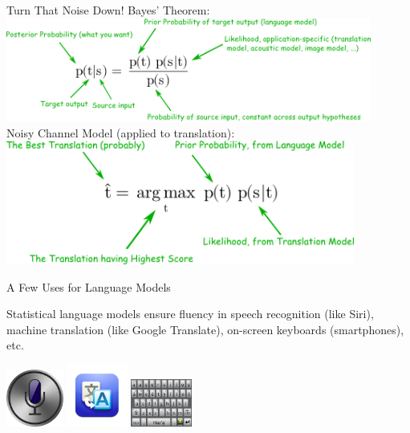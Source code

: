 \documentclass[xcolor=pdftex,x11names,table,hyperref]{beamer}
\begin{document}
\begin{frame}{Turn That Noise Down!}
	Bayes' Theorem: \\[0.5em]
	\includegraphics[width=0.90\textwidth]{images/bayes_theorem.png} \\[1.0em]
	\pause
	Noisy Channel Model (applied to translation): \\[0.5em]
	\includegraphics[width=0.86\textwidth]{images/noisy_channel.png}
\end{frame}


\begin{frame}{A Few Uses for Language Models}
 \begin{block}{}
	 Statistical language models ensure fluency in speech recognition (like Siri), machine translation (like Google Translate), on-screen keyboards (smartphones), etc.
 \end{block}
\begin{center}
	\includegraphics[width=0.14\textwidth]{images/siri.jpg} \hspace{2em}
	\includegraphics[width=0.15\textwidth]{images/google-translate.jpg} \hspace{2em}
	\includegraphics[width=0.15\textwidth]{images/navajo-android-keyboard-crop.png}\\[.1ex]
\end{center}
\end{frame}
\end{document}
